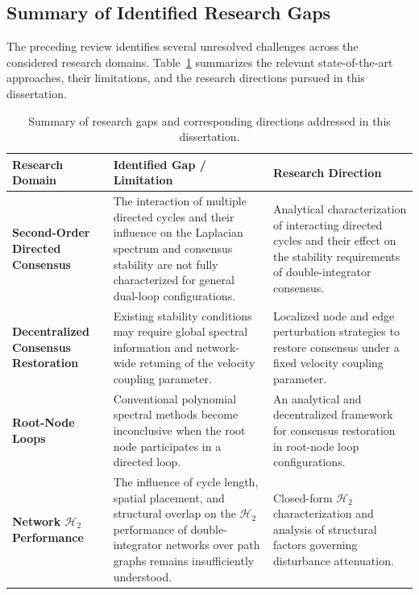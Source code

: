 \subsection{Summary of Identified Research Gaps} \label{subsec:summary_research_gaps}

The preceding review identifies several unresolved challenges across the considered research domains. Table~\ref{tab:literature_gaps} summarizes the relevant state-of-the-art approaches, their limitations, and the research directions pursued in this dissertation.

\begin{table}[ht!]
\centering
\caption{Summary of research gaps and corresponding directions addressed in this dissertation.}
\label{tab:literature_gaps}
\renewcommand{\arraystretch}{1.3}
\begin{tabularx}{\textwidth}{
|>{\raggedright\arraybackslash}p{2.8cm}
|>{\raggedright\arraybackslash}X
|>{\raggedright\arraybackslash}X|}
\hline
\textbf{Research Domain} &
\textbf{Identified Gap / Limitation} &
\textbf{Research Direction} \\ \hline

\textbf{Second-Order Directed Consensus} &
The interaction of multiple directed cycles and their influence on the Laplacian spectrum and consensus stability are not fully characterized for general dual-loop configurations. &
Analytical characterization of interacting directed cycles and their effect on the stability requirements of double-integrator consensus. \\ \hline

\textbf{Decentralized Consensus Restoration} &
Existing stability conditions may require global spectral information and network-wide retuning of the velocity coupling parameter. &
Localized node and edge perturbation strategies to restore consensus under a fixed velocity coupling parameter. \\ \hline

\textbf{Root-Node Loops} &
Conventional polynomial spectral methods become inconclusive when the root node participates in a directed loop. &
An analytical and decentralized framework for consensus restoration in root-node loop configurations. \\ \hline

\textbf{Network $\mathcal{H}_2$ Performance} &
The influence of cycle length, spatial placement, and structural overlap on the $\mathcal{H}_2$ performance of double-integrator networks over path graphs remains insufficiently understood. &
Closed-form $\mathcal{H}_2$ characterization and analysis of structural factors governing disturbance attenuation. \\ \hline


\end{tabularx}
\end{table}
